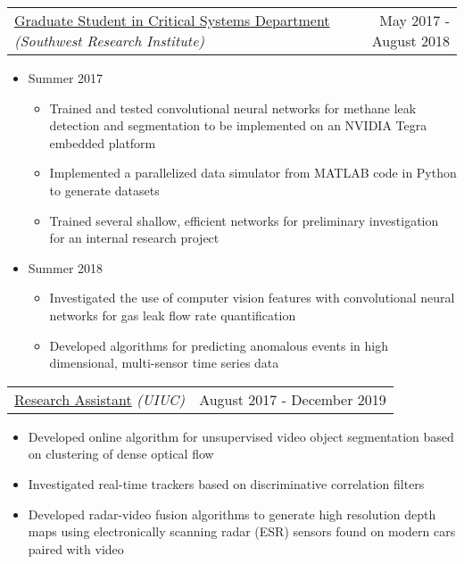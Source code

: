 \documentclass[10pt, letterpaper]{article}
\makeatletter
\newcommand{\headerrow}[2]
{\begin{tabular*}{\linewidth}{l@{\extracolsep{\fill}}r}
	#1 &
	#2 \\
\end{tabular*}}
\makeatother
\begin{document}
\headerrow
	{\uline{Graduate Student in Critical Systems Department} \textit{(Southwest Research Institute)}}
	{May 2017 - August 2018}
	\begin{comment}
	\begin{itemize}
		\item Trained and tested convolutional neural networks for
			methane leak detection and segmentation to be
			implemented on an embedded platform and
			investigated the use of computer vision features for flow rate
			quantification
		\item Implemented a parallelized data simulator from MATLAB code in Python to generate datasets
		\item Developed algorithms for predicting anomalous events in high dimensional, multi-sensor time series data 
	\end{itemize}
	\end{comment}
	\begin{itemize}%
		\item[] Summer 2017
			\begin{itemize}
				\item Trained and tested convolutional neural networks for methane leak detection and segmentation to be implemented on an NVIDIA Tegra embedded platform
				\item Implemented a parallelized data simulator
					from MATLAB code in Python to generate datasets
				\item Trained several shallow, efficient networks for preliminary investigation for an internal research project
			\end{itemize}
		\item[] Summer 2018
			\begin{itemize} 
				\item Investigated the use of computer vision features with convolutional neural networks for gas leak flow rate quantification
				\item Developed algorithms for predicting anomalous events in high dimensional, multi-sensor time series data 
			\end{itemize}
	\end{itemize}

\headerrow
	{\uline{Research Assistant} \textit{(UIUC)}}
	{August 2017 - December 2019}
	\begin{itemize}
		\item Developed online algorithm for unsupervised video object segmentation based on clustering of dense optical flow
		\item Investigated real-time trackers based on discriminative correlation filters
        \item Developed radar-video fusion algorithms to generate high
resolution depth maps using electronically scanning radar (ESR) sensors found on
modern cars paired with video
	\end{itemize}
	
\end{document}
